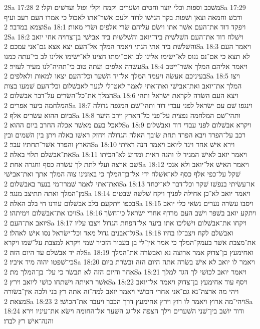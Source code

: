 2Sa 17:28  משׁכב וספות וכלי יוצר וחטים ושׂערים וקמח וקלי ופול ועדשׁים וקלי׃
2Sa 17:29  ודבשׁ וחמאה וצאן ושׁפות בקר הגישׁו לדוד ולעם אשׁר־אתו לאכול כי אמרו העם רעב ועיף וצמא במדבר׃
2Sa 18:1  ויפקד דוד את־העם אשׁר אתו וישׂם עליהם שׂרי אלפים ושׂרי מאות׃
2Sa 18:2  וישׁלח דוד את־העם השׁלשׁית ביד־יואב והשׁלשׁית ביד אבישׁי בן־צרויה אחי יואב והשׁלשׁת ביד אתי הגתי ויאמר המלך אל־העם יצא אצא גם־אני עמכם׃
2Sa 18:3  ויאמר העם לא תצא כי אם־נס ננוס לא־ישׂימו אלינו לב ואם־ימתו חצינו לא־ישׂימו אלינו לב כי־עתה כמנו עשׂרה אלפים ועתה טוב כי־תהיה־לנו מעיר לעזיר׃
2Sa 18:4  ויאמר אליהם המלך אשׁר־ייטב בעיניכם אעשׂה ויעמד המלך אל־יד השׁער וכל־העם יצאו למאות ולאלפים׃
2Sa 18:5  ויצו המלך את־יואב ואת־אבישׁי ואת־אתי לאמר לאט־לי לנער לאבשׁלום וכל־העם שׁמעו בצות המלך את־כל־השׂרים על־דבר אבשׁלום׃
2Sa 18:6  ויצא העם השׂדה לקראת ישׂראל ותהי המלחמה ביער אפרים׃
2Sa 18:7  וינגפו שׁם עם ישׂראל לפני עבדי דוד ותהי־שׁם המגפה גדולה ביום ההוא עשׂרים אלף׃
2Sa 18:8  ותהי־שׁם המלחמה נפצית על־פני כל־הארץ וירב היער לאכל בעם מאשׁר אכלה החרב ביום ההוא׃
2Sa 18:9  ויקרא אבשׁלום לפני עבדי דוד ואבשׁלום רכב על־הפרד ויבא הפרד תחת שׂובך האלה הגדולה ויחזק ראשׁו באלה ויתן בין השׁמים ובין הארץ והפרד אשׁר־תחתיו עבר׃
2Sa 18:10  וירא אישׁ אחד ויגד ליואב ויאמר הנה ראיתי את־אבשׁלם תלוי באלה׃
2Sa 18:11  ויאמר יואב לאישׁ המגיד לו והנה ראית ומדוע לא־הכיתו שׁם ארצה ועלי לתת לך עשׂרה כסף וחגרה אחת׃
2Sa 18:12  ויאמר האישׁ אל־יואב ולא אנכי שׁקל על־כפי אלף כסף לא־אשׁלח ידי אל־בן־המלך כי באזנינו צוה המלך אתך ואת־אבישׁי ואת־אתי לאמר שׁמרו־מי בנער באבשׁלום׃
2Sa 18:13  או־עשׂיתי בנפשׁו שׁקר וכל־דבר לא־יכחד מן־המלך ואתה תתיצב מנגד׃
2Sa 18:14  ויאמר יואב לא־כן אחילה לפניך ויקח שׁלשׁה שׁבטים בכפו ויתקעם בלב אבשׁלום עודנו חי בלב האלה׃
2Sa 18:15  ויסבו עשׂרה נערים נשׂאי כלי יואב ויכו את־אבשׁלום וימיתהו׃
2Sa 18:16  ויתקע יואב בשׁפר וישׁב העם מרדף אחרי ישׂראל כי־חשׂך יואב את־העם׃
2Sa 18:17  ויקחו את־אבשׁלום וישׁליכו אתו ביער אל־הפחת הגדול ויצבו עליו גל־אבנים גדול מאד וכל־ישׂראל נסו אישׁ לאהלו׃
2Sa 18:18  ואבשׁלם לקח ויצב־לו בחיו את־מצבת אשׁר בעמק־המלך כי אמר אין־לי בן בעבור הזכיר שׁמי ויקרא למצבת על־שׁמו ויקרא לה יד אבשׁלם עד היום הזה׃
2Sa 18:19  ואחימעץ בן־צדוק אמר ארוצה נא ואבשׂרה את־המלך כי־שׁפטו יהוה מיד איביו׃
2Sa 18:20  ויאמר לו יואב לא אישׁ בשׂרה אתה היום הזה ובשׂרת ביום אחר והיום הזה לא תבשׂר כי על־ בן־המלך מת׃
2Sa 18:21  ויאמר יואב לכושׁי לך הגד למלך אשׁר ראיתה וישׁתחו כושׁי ליואב וירץ׃
2Sa 18:22  ויסף עוד אחימעץ בן־צדוק ויאמר אל־יואב ויהי מה ארצה־נא גם־אני אחרי הכושׁי ויאמר יואב למה־זה אתה רץ בני ולכה אין־בשׂורה מצאת׃
2Sa 18:23  ויהי־מה ארוץ ויאמר לו רוץ וירץ אחימעץ דרך הככר ויעבר את־הכושׁי׃
2Sa 18:24  ודוד יושׁב בין־שׁני השׁערים וילך הצפה אל־גג השׁער אל־החומה וישׂא את־עיניו וירא והנה־אישׁ רץ לבדו׃
